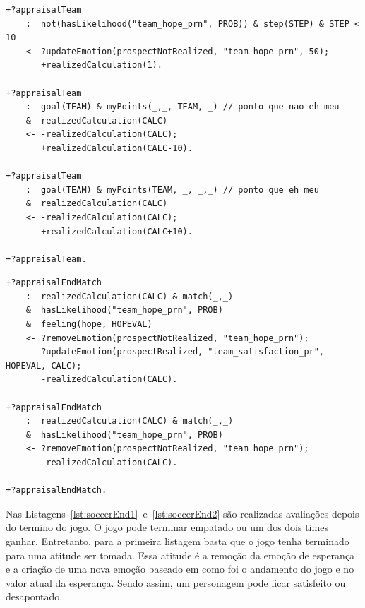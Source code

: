 \begin{center}
    \begin{minipage}{130mm}
	\lstset{linewidth=130mm}
	\begin{lstlisting}[frame=trbl,
caption=Parte do código do agente referente ao andamento do jogo.,
label=lst:soccerTeam]
+?appraisalTeam
    :  not(hasLikelihood("team_hope_prn", PROB)) & step(STEP) & STEP < 10
    <- ?updateEmotion(prospectNotRealized, "team_hope_prn", 50);
       +realizedCalculation(1).

+?appraisalTeam
    :  goal(TEAM) & myPoints(_,_, TEAM, _) // ponto que nao eh meu
    &  realizedCalculation(CALC)
    <- -realizedCalculation(CALC);
       +realizedCalculation(CALC-10).

+?appraisalTeam
    :  goal(TEAM) & myPoints(TEAM, _, _,_) // ponto que eh meu
    &  realizedCalculation(CALC)
    <- -realizedCalculation(CALC);
       +realizedCalculation(CALC+10).

+?appraisalTeam.
	\end{lstlisting}
    \end{minipage}
\end{center}

\begin{center}
    \begin{minipage}{140mm}
	\lstset{linewidth=140mm}
	\begin{lstlisting}[frame=trbl,
caption=Parte do código do agente referente à avaliação do final do jogo para
as emoções de probabilidade.,
label=lst:soccerEnd1]
+?appraisalEndMatch
    :  realizedCalculation(CALC) & match(_,_)
    &  hasLikelihood("team_hope_prn", PROB)
    &  feeling(hope, HOPEVAL)
    <- ?removeEmotion(prospectNotRealized, "team_hope_prn");
       ?updateEmotion(prospectRealized, "team_satisfaction_pr", HOPEVAL, CALC);
       -realizedCalculation(CALC).

+?appraisalEndMatch
    :  realizedCalculation(CALC) & match(_,_)
    &  hasLikelihood("team_hope_prn", PROB)
    <- ?removeEmotion(prospectNotRealized, "team_hope_prn");
       -realizedCalculation(CALC).

+?appraisalEndMatch.
	\end{lstlisting}
    \end{minipage}
\end{center}

Nas Listagens~\ref{lst:soccerEnd1}~e~\ref{lst:soccerEnd2} são realizadas
avaliações depois do termino do jogo. O jogo pode terminar empatado ou um dos
dois times ganhar. Entretanto, para a primeira listagem basta que o jogo tenha
terminado para uma atitude ser tomada. Essa atitude é a remoção da emoção de
esperança e a criação de uma nova emoção baseado em como foi o andamento do
jogo e no valor atual da esperança. Sendo assim, um personagem pode ficar
satisfeito ou desapontado.

